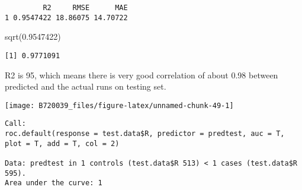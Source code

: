 \documentclass[
]{article}
\newenvironment{Shaded}{\begin{snugshade}}{\end{snugshade}}
\newcommand{\AttributeTok}[1]{\textcolor[rgb]{0.77,0.63,0.00}{#1}}
\newcommand{\DecValTok}[1]{\textcolor[rgb]{0.00,0.00,0.81}{#1}}
\newcommand{\FloatTok}[1]{\textcolor[rgb]{0.00,0.00,0.81}{#1}}
\newcommand{\FunctionTok}[1]{\textcolor[rgb]{0.00,0.00,0.00}{#1}}
\newcommand{\NormalTok}[1]{#1}
\newcommand{\OtherTok}[1]{\textcolor[rgb]{0.56,0.35,0.01}{#1}}
\newcommand{\SpecialCharTok}[1]{\textcolor[rgb]{0.00,0.00,0.00}{#1}}
\newcommand{\StringTok}[1]{\textcolor[rgb]{0.31,0.60,0.02}{#1}}
\begin{document}
\begin{verbatim}
         R2     RMSE      MAE
1 0.9547422 18.86075 14.70722
\end{verbatim}

\begin{Shaded}
\begin{Highlighting}[]
\FunctionTok{sqrt}\NormalTok{(}\FloatTok{0.9547422}\NormalTok{)}
\end{Highlighting}
\end{Shaded}

\begin{verbatim}
[1] 0.9771091
\end{verbatim}

R2 is 95, which means there is very good correlation of about 0.98
between predicted and the actual runs on testing set.

\begin{Shaded}
\end{Shaded}

\begin{center}\texttt{[image: B720039\_files/figure-latex/unnamed-chunk-49-1]} \end{center}

\begin{verbatim}
Call:
roc.default(response = test.data$R, predictor = predtest, auc = T,     plot = T, add = T, col = 2)

Data: predtest in 1 controls (test.data$R 513) < 1 cases (test.data$R 595).
Area under the curve: 1
\end{verbatim}
\end{document}
